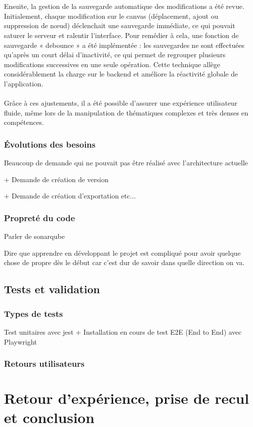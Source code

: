 \documentclass[12pt]{article}
\begin{document}
\\\\
Ensuite, la gestion de la sauvegarde automatique des modifications a été revue. Initialement, chaque modification sur le canvas (déplacement, ajout ou suppression de nœud) déclenchait une sauvegarde immédiate, ce qui pouvait saturer le serveur et ralentir l’interface. Pour remédier à cela, une fonction de sauvegarde « debounce » a été implémentée : les sauvegardes ne sont effectuées qu’après un court délai d’inactivité, ce qui permet de regrouper plusieurs modifications successives en une seule opération. Cette technique allège considérablement la charge sur le backend et améliore la réactivité globale de l’application.
\\\\
Grâce à ces ajustements, il a été possible d’assurer une expérience utilisateur fluide, même lors de la manipulation de thématiques complexes et très denses en compétences.
\subsubsection{Évolutions des besoins}
Beaucoup de demande qui ne pouvait pas être réalisé avec l'architecture actuelle

+ Demande de création de version

+ Demande de création d'exportation etc...
\subsubsection{Propreté du code}
Parler de sonarqube

Dire que apprendre en développant le projet est compliqué pour avoir quelque chose de propre dès le début car c'est dur de savoir dans quelle direction on va.

\subsection{Tests et validation}
\subsubsection{Types de tests}
Test unitaires avec jest
+ Installation en cours de test E2E (End to End) avec Playwright
\subsubsection{Retours utilisateurs}

\section{Retour d’expérience, prise de recul et conclusion}
\end{document}
